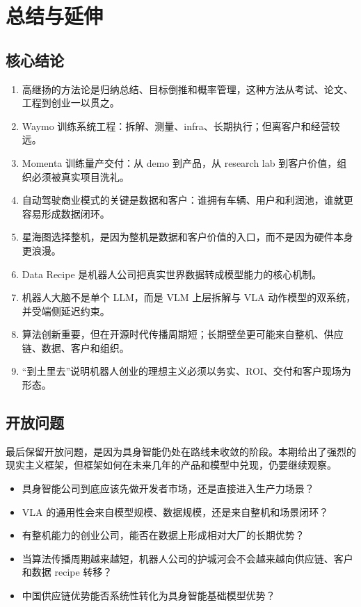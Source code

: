 \section{总结与延伸}

\subsection{核心结论}

\begin{enumerate}
\item 高继扬的方法论是归纳总结、目标倒推和概率管理，这种方法从考试、论文、工程到创业一以贯之。
\item Waymo 训练系统工程：拆解、测量、infra、长期执行；但离客户和经营较远。
\item Momenta 训练量产交付：从 demo 到产品，从 research lab 到客户价值，组织必须被真实项目洗礼。
\item 自动驾驶商业模式的关键是数据和客户：谁拥有车辆、用户和利润池，谁就更容易形成数据闭环。
\item 星海图选择整机，是因为整机是数据和客户价值的入口，而不是因为硬件本身更浪漫。
\item Data Recipe 是机器人公司把真实世界数据转成模型能力的核心机制。
\item 机器人大脑不是单个 LLM，而是 VLM 上层拆解与 VLA 动作模型的双系统，并受端侧延迟约束。
\item 算法创新重要，但在开源时代传播周期短；长期壁垒更可能来自整机、供应链、数据、客户和组织。
\item “到土里去”说明机器人创业的理想主义必须以务实、ROI、交付和客户现场为形态。
\end{enumerate}

\subsection{开放问题}

最后保留开放问题，是因为具身智能仍处在路线未收敛的阶段。本期给出了强烈的现实主义框架，但框架如何在未来几年的产品和模型中兑现，仍要继续观察。

\begin{itemize}
\item 具身智能公司到底应该先做开发者市场，还是直接进入生产力场景？
\item VLA 的通用性会来自模型规模、数据规模，还是来自整机和场景闭环？
\item 有整机能力的创业公司，能否在数据上形成相对大厂的长期优势？
\item 当算法传播周期越来越短，机器人公司的护城河会不会越来越向供应链、客户和数据 recipe 转移？
\item 中国供应链优势能否系统性转化为具身智能基础模型优势？
\end{itemize}

